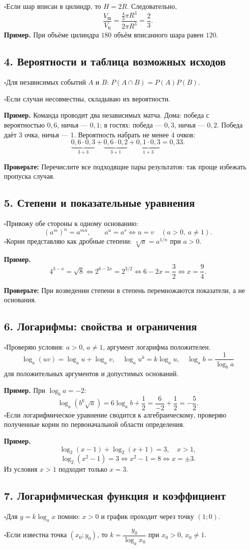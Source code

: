 \documentclass[a4paper,12pt]{article}
\newcommand{\ck}{\(\square\)\enspace}
\newcommand{\topic}[1]{\needspace{5\baselineskip}\subsection*{\color{darkaccent}#1}}
\newcommand{\tip}[1]{\par\textcolor{darkaccent}{\textbf{Проверьте:}} #1\par}
\begin{document}
\ck Если шар вписан в цилиндр, то $H=2R$. Следовательно,
\[
\frac{V_{\text{ш}}}{V_{\text{ц}}}
=\frac{\tfrac43\pi R^3}{2\pi R^3}
=\boxed{\frac23}.
\]
\textbf{Пример.} При объёме цилиндра $180$ объём вписанного шара равен $120$.

\topic{4. Вероятности и таблица возможных исходов}
\ck Для независимых событий $A$ и $B$:
$P(A\cap B)=P(A)P(B)$.

\ck Если случаи несовместны, складываю их вероятности.

\textbf{Пример.} Команда проводит два независимых матча. Дома: победа с вероятностью $0{,}6$, ничья --- $0{,}1$; в гостях: победа --- $0{,}3$, ничья --- $0{,}2$. Победа даёт 3 очка, ничья --- 1. Вероятность набрать не менее 4 очков:
\[
\underbrace{0{,}6\cdot0{,}3}_{3+3}
+\underbrace{0{,}6\cdot0{,}2}_{3+1}
+\underbrace{0{,}1\cdot0{,}3}_{1+3}
=\boxed{0{,}33}.
\]
\tip{Перечислите все подходящие пары результатов: так проще избежать пропуска случая.}

\topic{5. Степени и показательные уравнения}
\ck Привожу обе стороны к одному основанию:
\[
(a^m)^n=a^{mn},\qquad a^{u}=a^{v}\iff u=v
\quad (a>0,\ a\ne1).
\]
\ck Корни представляю как дробные степени: $\sqrt[n]{a}=a^{1/n}$ при $a>0$.

\textbf{Пример.}
\[
4^{3-x}=\sqrt8\iff 2^{6-2x}=2^{3/2}
\iff 6-2x=\frac32\iff \boxed{x=\frac94}.
\]
\tip{При возведении степени в степень перемножаются показатели, а не основания.}
\clearpage

\enlargethispage{2\baselineskip}
\topic{6. Логарифмы: свойства и ограничения}
\ck Проверяю условия: $a>0$, $a\ne1$, аргумент логарифма положителен.
\[
\log_a(uv)=\log_a u+\log_a v,\quad
\log_a u^k=k\log_a u,\quad
\log_a b=\frac1{\log_b a}
\]
для положительных аргументов и допустимых оснований.

\textbf{Пример.} При $\log_b a=-2$:
\[
\log_a(b^6\sqrt a)
=6\log_a b+\frac12
=\frac6{-2}+\frac12=\boxed{-\frac52}.
\]
\ck Если логарифмическое уравнение сводится к алгебраическому, проверяю полученные корни по первоначальной области определения.

\textbf{Пример.}
\[
\log_2(x-1)+\log_2(x+1)=3,\quad x>1,
\]
\[
\log_2(x^2-1)=3\iff x^2-1=8\iff x=\pm3.
\]
Из условия $x>1$ подходит только $\boxed{x=3}$.

\topic{7. Логарифмическая функция и коэффициент}
\ck Для $y=k\log_a x$ помню: $x>0$ и график проходит через точку $(1;0)$.

\ck Если известна точка $(x_0;y_0)$, то $k=\dfrac{y_0}{\log_a x_0}$ при $x_0>0$, $x_0\ne1$.
\end{document}
